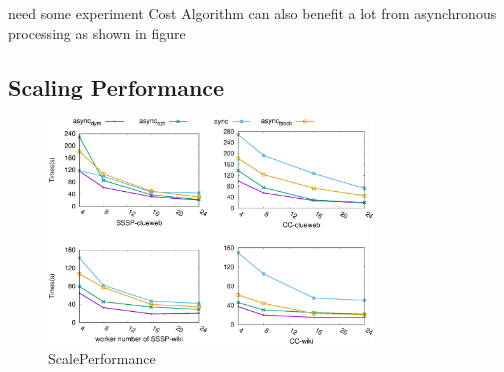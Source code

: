 {\color{blue} need some experiment
 Cost Algorithm can also benefit a lot from asynchronous processing as shown in figure 
}
 \subsection{Scaling Performance}
 \label{sec:expr:scale}

\begin{figure}[!t]
	\vspace{0.0in}
	\centering
	\includegraphics[width=3.4in]{figuration/scale.eps}
	\vspace{-0.1in}
	\caption{ScalePerformance}
	\label{fig:scale}
	\vspace{-0.1in}
\end{figure}


